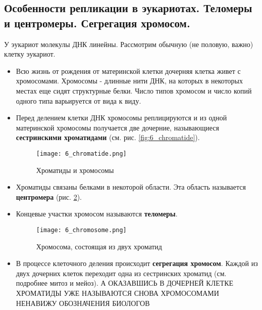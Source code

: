 \subsection{Особенности репликации в эукариотах. Теломеры и центромеры. Сегрегация хромосом.}

У эукариот молекулы ДНК линейны. Рассмотрим обычную (не половую, важно) клетку эукариот. 

\begin{itemize}
    \item Всю жизнь от рождения от материнской клетки дочерняя клетка живет с хромосомами. Хромосомы - длинные нити ДНК, на которых в некоторых местах еще сидят структурные белки. Число типов хромосом и число копий одного типа варьируется от вида к виду.
    
    \item Перед делением клетки ДНК хромосомы реплицируются и из одной материнской хромосомы получается две дочерние, называющиеся \textbf{сестринскими хроматидами} (см. рис. \ref{fig:6_chromatide}).
    
    \begin{figure}[H]
        \centering
        \texttt{[image: 6\_chromatide.png]}
        \caption{Хроматиды и хромосомы}
        \label{fig:6_сhromatide}
    \end{figure}
    
    \item Хроматиды связаны белками в некоторой области. Эта область называется \textbf{центромера} (рис. \ref{fig:6_chromosome}).
    
    \item Концевые участки хромосом называются \textbf{теломеры}.
    
    \begin{figure}[H]
        \centering
        \texttt{[image: 6\_chromosome.png]}
        \caption{Хромосома, состоящая из двух хроматид}
        \label{fig:6_chromosome}
    \end{figure}
    
    \item В процессе клеточного деления происходит \textbf{сегрегация хромосом}. Каждой из двух дочерних клеток переходит одна из сестринских хроматид (см. подробнее митоз и мейоз). А ОКАЗАВШИСЬ В ДОЧЕРНЕЙ КЛЕТКЕ ХРОМАТИДЫ УЖЕ НАЗЫВАЮТСЯ СНОВА ХРОМОСОМАМИ НЕНАВИЖУ ОБОЗНАЧЕНИЯ БИОЛОГОВ
\end{itemize}
